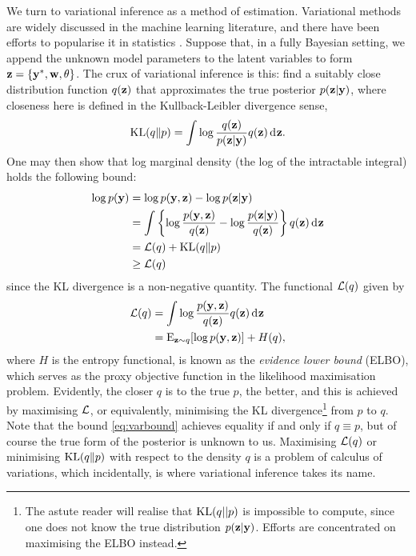 We turn to variational inference as a method of estimation. Variational methods are widely discussed in the machine learning literature, and there have been efforts to popularise it in statistics \citep{blei2017variational}.
Suppose that, in a fully Bayesian setting, we append the unknown model parameters to the latent variables to form ${\mathbf z} = \{{\mathbf y}^*, {\mathbf w}, \theta\}$.
The crux of variational inference is this: find a suitably close distribution function $q({\mathbf z})$ that approximates the true posterior $p({\mathbf z}|{\mathbf y})$, where closeness here is defined in the Kullback-Leibler divergence sense,
\[
  \operatorname{KL}(q\Vert p) = \int \log \frac{q({\mathbf z})}{p({\mathbf z}|{\mathbf y})} q({\mathbf z}) \operatorname{d}\hspace{0.5pt}\! {\mathbf z}.
\]
One may then show that log marginal density (the log of the intractable integral) holds the following bound:
    \begin{align}
      \log p({\mathbf y}) &= \log p({\mathbf y},{\mathbf z}) - \log p({\mathbf z}|{\mathbf y}) \nonumber \\
      &= \int \left\{ \log \frac{p({\mathbf y},{\mathbf z})}{q({\mathbf z})} - \log \frac{p({\mathbf z}|{\mathbf y})}{q({\mathbf z})} \right\} q({\mathbf z}) \operatorname{d}\hspace{0.5pt}\! {\mathbf z} \nonumber \\    
      &=  {\mathcal L}(q) +  \operatorname{KL}(q \Vert p) \nonumber \\
      &\geq {\mathcal L}(q) \label{eq:varbound}
    \end{align}
since the KL divergence is a non-negative quantity.
The functional ${\mathcal L}(q)$ given by 
\begin{align}
  {\mathcal L}(q) 
  &= \int \log \frac{p({\mathbf y},{\mathbf z})}{q({\mathbf z})} q({\mathbf z}) \operatorname{d}\hspace{0.5pt}\! {\mathbf z} \nonumber \\
  &= \operatorname{E}_{{\mathbf z}\sim q}[\log p({\mathbf y},{\mathbf z})] + H(q), \label{eq:elbo1}
\end{align}
where $H$ is the entropy functional, is known as the \emph{evidence lower bound} (ELBO), which serves as the proxy objective function in the likelihood maximisation problem.
Evidently, the closer $q$ is to the true $p$, the better, and this is achieved by maximising ${\mathcal L}$, or equivalently, minimising the KL divergence\footnote{The astute reader will realise that $\operatorname{KL}(q||p)$ is impossible to compute, since one does not know the true distribution $p({\mathbf z}|{\mathbf y})$. Efforts are concentrated on maximising the ELBO instead.} from $p$ to $q$.
Note that the bound \cref{eq:varbound} achieves equality if and only if $q \equiv p$, but of course the true form of the posterior is unknown to us.
Maximising ${\mathcal L}(q)$ or minimising $\operatorname{KL}(q\Vert p)$ with respect to the density $q$ is a problem of calculus of variations, which incidentally, is where variational inference takes its name.

